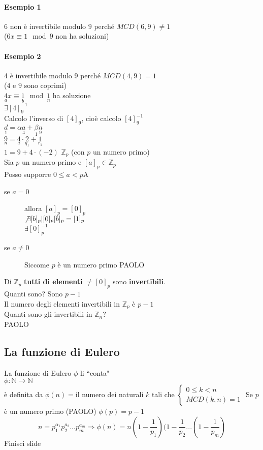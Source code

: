 \paragraph{Esempio 1} $6$ non è invertibile modulo $9$ perché $MCD(6,9)\neq 1$\\
($6x\equiv 1\mod 9$ non ha soluzioni)
\paragraph{Esempio 2} 4 è invertibile modulo $9$ perché $MCD(4,9)=1$\\
($4$ e $9$ sono coprimi)\\
$\underset{a}{4} x\equiv \underset{b}{1}\mod \underset{n}{1}$ ha soluzione\\
$\exists [4]_9^{-1}$\\
Calcolo l'inverso di $[4]_9$, cioè calcolo $[4]_9^{-1}$\\
$\underset{1}{d}=\alpha\underset{4}{a}+\underset{1}{\beta}\underset{9}{n}$\\
$\underset{n}{9}=\underset{a}{4}\cdot\underset{q_1}{2}+\underset{r_1}{1}$\\
$1=9+4\cdot (-2)$
{\color{red}$\mathbb{Z}_p$ (con $p$ un numero primo)}\\
Sia $p$ un numero primo e $[a]_p\in\mathbb{Z}_p$\\
Posso supporre $0\leq a < p$A\\
\begin{description}
    \item [se $a = 0$] allora $[a]_p=[0]_p$\\
        $\not\exists [b]_p|[0]_p[b]_p=[1]_p$\\
        $\exists [0]_p^{-1}$
    \item[se $a\neq 0$] {\color{red} Siccome $p$ è un numero primo}
        {\color{purple}PAOLO}
\end{description}
Di $\mathbb{Z}_p$ \textbf{tutti di elementi} $\neq [0]_p$ sono \textbf{invertibili}.\\
Quanti sono? Sono $p-1$\\
Il numero degli elementi invertibili in $\mathbb{Z}_p$ è $p-1$\\
Quanti sono gli invertibili in $\mathbb{Z}_n$?\\
{\color{purple}PAOLO}
\subsection{La funzione di Eulero}
La funzione di Eulero $\phi$ li ``conta"\\
$\phi : \mathbb{N}\longrightarrow\mathbb{N}$\\
è definita da $\phi(n)=$il numero dei naturali $k$ tali che 
$
\begin{cases}
    0\leq k<n\\
    MCD(k,n)=1
\end{cases}
$
Se $p$ è un numero primo ({\color{purple}PAOLO}) $\phi(p)=p-1$
$$n=p_1^{\alpha_1}p_2^{a_2}...p_m^{a_m}\Longrightarrow\phi(n)=n(1-\frac{1}{p_1})(1-\frac{1}{p_2}...
(1-\frac{1}{p_m})$$
Finisci slide 
